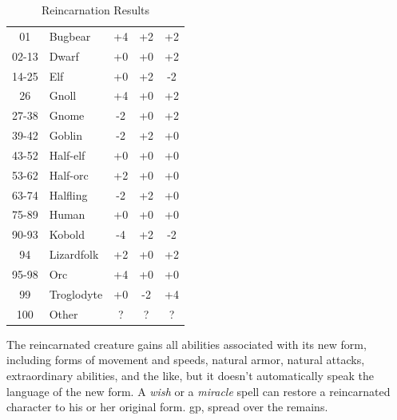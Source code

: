 \begin{table}[htb]
\caption{Reincarnation Results}
\centering
\begin{tabular}{c l c c c}
01 & Bugbear & +4 & +2 & +2\\
02-13 & Dwarf & +0 & +0 & +2\\
14-25 & Elf & +0 & +2 & -2\\
26 & Gnoll & +4 & +0 & +2\\
27-38 & Gnome & -2 & +0 & +2\\
39-42 & Goblin & -2 & +2 & +0\\
43-52 & Half-elf & +0 & +0 & +0\\
53-62 & Half-orc & +2 & +0 & +0\\
63-74 & Halfling & -2 & +2 & +0\\
75-89 & Human & +0 & +0 & +0\\
90-93 & Kobold & -4 & +2 & -2\\
94 & Lizardfolk & +2 & +0 & +2\\
95-98 & Orc & +4 & +0 & +0\\
99 & Troglodyte & +0 & -2 & +4\\
100 & Other & ? & ? & ?\\
\end{tabular}
\end{table}
The reincarnated creature gains all abilities associated with its new form, including
forms of movement and speeds, natural armor, natural attacks, extraordinary abilities,
and the like, but it doesn't automatically speak the language of the new form.
A \textit{wish} or a \textit{miracle} spell can restore a reincarnated character
to his or her original form.
gp, spread over the remains.